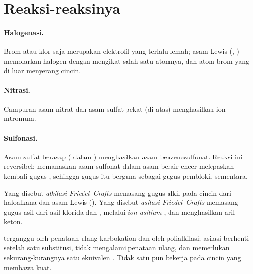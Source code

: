 \section{Reaksi-reaksinya}

\paragraph{Halogenasi.} Brom atau klor saja merupakan elektrofil yang
terlalu lemah; asam Lewis (, ) memolarkan halogen dengan
mengikat salah satu atomnya, dan atom brom yang di luar menyerang cincin.

\paragraph{Nitrasi.} Campuran asam nitrat dan asam sulfat pekat (di atas)
menghasilkan ion nitronium.

\paragraph{Sulfonasi.} Asam sulfat berasap ( dalam )
menghasilkan asam benzenasulfonat. Reaksi ini reversibel: memanaskan asam
sulfonat dalam asam berair encer melepaskan kembali gugus , sehingga
gugus itu berguna sebagai gugus pemblokir sementara.

\begin{definition}\label{def:b2:aromatic-substitution:friedel-crafts}
Yang disebut \emph{alkilasi Friedel--Crafts}
memasang gugus alkil pada cincin  dari haloalkana dan asam Lewis
(). Yang disebut \emph{asilasi
Friedel--Crafts} memasang gugus asil
 dari asil klorida dan , melalui \emph{ion asilium}
, dan menghasilkan aril keton.
\end{definition}

\begin{proposition}\label{prop:b2:aromatic-substitution:friedel-crafts-limits}
 terganggu oleh penataan ulang karbokation dan oleh
polialkilasi; asilasi berhenti setelah satu substitusi, tidak mengalami
penataan ulang, dan memerlukan sekurang-kurangnya satu ekuivalen
. Tidak satu pun bekerja pada cincin yang membawa 
kuat.
\end{proposition}

